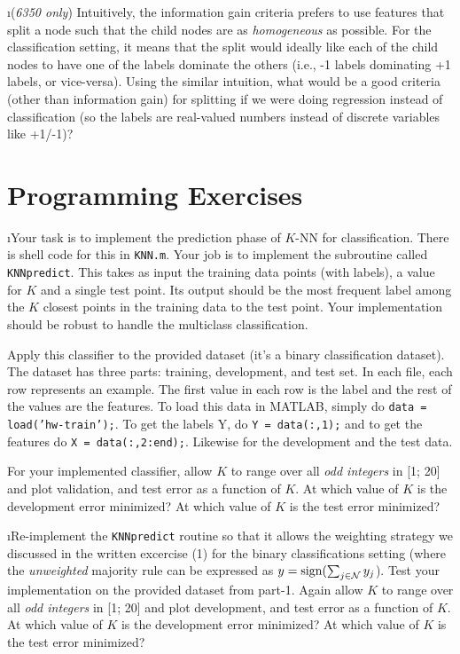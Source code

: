 \documentclass[fleqn]{article}
\begin{document}
\i (\textit{6350 only}) Intuitively, the information gain criteria prefers to use 
features that split a node such that the child nodes are as \textit{homogeneous} 
as possible. For the classification setting, it means that the split would ideally 
like each of the child nodes to have one of the labels dominate the others (i.e., 
-1 labels dominating +1 labels, or vice-versa). Using the similar intuition, what 
would be a good criteria (other than information gain) for splitting if we were 
doing regression instead of classification (so the labels are real-valued numbers 
instead of discrete variables like +1/-1)?

\ene

\section{Programming Exercises}

\bee

\i Your task is to implement the prediction phase of $K$-NN for classification. 
There is shell code for this in \texttt{KNN.m}. Your job is to implement the 
subroutine called \texttt{KNNpredict}. This takes as input the training data 
points (with labels), a value for $K$ and a single test point. Its output 
should be the most frequent label among the $K$ closest points in the training 
data to the test point. Your implementation should be robust to handle the 
multiclass classification.

Apply this classifier to the provided dataset (it's a binary classification dataset). 
The dataset has three parts: training, development, and test set. In each file, each
row represents an example. The first value in each row is the label and the rest of the 
values are the features. To load this data in MATLAB, simply do \texttt{data = 
load('hw-train');}. To get the labels Y, do \texttt{Y = data(:,1);} and to get the 
features do \texttt{X = data(:,2:end);}. Likewise for the development and the test data.

For your implemented classifier, allow $K$ to range over all \textit{odd integers} 
in [1; 20] and plot validation, and test error as a function of $K$. At which 
value of $K$ is the development error minimized? At which value of $K$ is the test 
error minimized?

\i Re-implement the \texttt{KNNpredict} routine so that it allows the weighting strategy 
we discussed in the written excercise (1) for the binary classifications setting
(where the \textit{unweighted} majority rule can be expressed as $y = \textrm{sign}(\sum_{j 
\in \mathcal{N}} y_j$). Test your implementation on the provided dataset from part-1. 
Again allow $K$ to range over all \textit{odd integers} in [1; 20] and plot development, 
and test error as a function of $K$. At which value of $K$ is the development error 
minimized? At which value of $K$ is the test error minimized?

\ene
\end{document}
